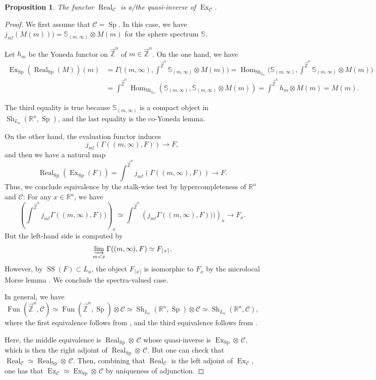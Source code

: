 \documentclass[11pt]{amsart}
\numberwithin{equation}{section}
\theoremstyle{plain}
\newtheorem{Prop}[prop]{Proposition}
\theoremstyle{definition}
\theoremstyle{remark}
\newcommand{\bR} { {\mathbb{R}}}
\newcommand{\bS} { {\mathbb{S}}}
\newcommand{\cC} { {\mathcal{C}}}
\newcommand{\Sh} { {\operatorname{Sh}}}
\newcommand\Fun{\operatorname{Fun}}
\newcommand\Hom{\operatorname{Hom}}
\newcommand\Sp{ {\operatorname{Sp} } }
\newcommand\ms{\operatorname{SS}}
\newcommand{\rarbZ} { \overrightarrow{\mathbb{Z}}}
\newcommand{\Ex}{\operatorname{Ex}}
\newcommand{\Real}{\operatorname{Real}}
\begin{document}
\begin{Prop}The functor $\Real_\cC$ is a/the quasi-inverse of $\Ex_\cC$.
\end{Prop}
\begin{proof}We first assume that $\cC=\Sp$. In this case, we have $j_{m!}(M(m)))=\bS_{(m,\infty)}\otimes M(m)$ for the sphere spectrum $\bS$.

Let $h_m$ be the Yoneda functor on $ \rarbZ^n$ of $m\in \rarbZ^n$. On the one hand, we have 
\begin{align*}
    \Ex_\Sp(\Real_\Sp(M)) (m)&=\Gamma\Big((m,\infty),\int^{\rarbZ^n} \bS_{(m,\infty)}\otimes M(m)\Big)    =\Hom_{\Sh_{L_n}}\Big(\bS_{(m,\infty)},\int^{\rarbZ^n} \bS_{(m,\infty)}\otimes M(m)\Big)\\
   &=\int^{\rarbZ^n} \Hom_{\Sh_{L_n}}(\bS_{(m,\infty)}, \bS_{(m,\infty)}\otimes M(m)) =\int^{\rarbZ^n} h_m\otimes M(m) 
     =M(m).
\end{align*}

The third equality is true because $\bS_{(m,\infty)}$ is a compact object in $\Sh_{L_n}(\bR^n,\Sp)$, and the last equality is the co-Yoneda lemma.


On the other hand, the evaluation functor induces
\[j_{m!}(\Gamma((m,\infty),F))\to F,\]
and then we have a natural map
\[\Real_\Sp(\Ex_\Sp(F)) = \int^{\rarbZ^n} j_{m!}(\Gamma((m,\infty),F)) \to F.
\]
Thus, we conclude equivalence by the stalk-wise test by hypercompleteness of $\bR^n$ and $\cC$: For any $x\in \bR^n$, we have
\[  \left(\int^{\rarbZ^n} j_{m!}\Gamma((m,\infty),F))\right)_x\simeq  \int^{\rarbZ^n}\left( j_{m!}\Gamma((m,\infty),F)))\right)_x \to F_x.\]
But the left-hand side is computed by
\[\varinjlim_{m< x}\Gamma((m,\infty),F)\simeq F_{\lceil x\rceil}.\]
However, by $\ms(F)\subset L_n$, the object $F_{\lceil x\rceil}$ is isomorphic to $F_x$ by the microlocal Morse lemma \cite[Proposition 5.4.19]{KS90}. We conclude the spectra-valued case.

In general, we have
\[\Fun(\rarbZ^n,\cC)\simeq\Fun(\rarbZ^n,\Sp)\otimes\cC\simeq\Sh_{L_n}(\bR^n,\Sp)\otimes\cC\simeq \Sh_{L_n}(\bR^n,\cC),\]
where the first equivalence follows from \cite[Lemma 4.8.1.16, Proposition 4.8.1.17]{HA}, and the third equivalence follows from \cite[Proposition 2.7]{Zhang_K_Remark}.

Here, the middle equivalence is $ \Real_\Sp\otimes \,\cC$ whose quasi-inverse is $\Ex_\Sp\otimes \,\cC$, which is then the right adjoint of $ \Real_\Sp\otimes \,\cC$. But one can check that $\Real_\cC\simeq \Real_\Sp\otimes \,\cC$. Then, combining that $\Real_\cC$ is the left adjoint of $\Ex_\cC$, one has that $\Ex_\cC\simeq \Ex_\Sp\otimes\, \cC$ by uniqueness of adjunction.\end{proof}
\end{document}
